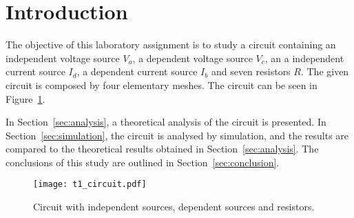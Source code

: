\section{Introduction}
\label{sec:introduction}

The objective of this laboratory assignment is to study a circuit containing an independent voltage source $V_a$, a dependent voltage source $V_c$, an a independent current source $I_d$, a dependent current source $I_b$ and seven resistors $R$. The given circuit is composed by four elementary meshes. The circuit can be seen in Figure~\ref{fig:t1_circuit}.


In Section~\ref{sec:analysis}, a theoretical analysis of the circuit is
presented. In Section~\ref{sec:simulation}, the circuit is analysed by
simulation, and the results are compared to the theoretical results obtained in
Section~\ref{sec:analysis}. The conclusions of this study are outlined in
Section~\ref{sec:conclusion}.

\begin{figure}[h] \centering
\texttt{[image: t1\_circuit.pdf]}
\caption{Circuit with independent sources, dependent sources and resistors.}
\label{fig:t1_circuit}
\end{figure}



